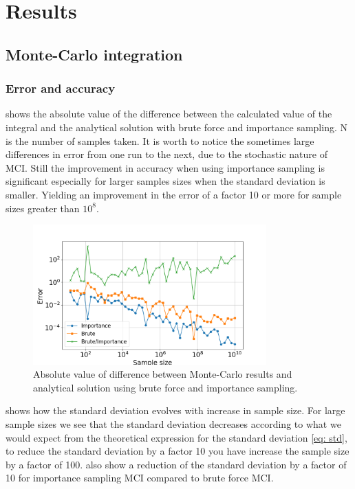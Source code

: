 \section{Results}

\subsection{Monte-Carlo integration}

\subsubsection{Error and accuracy}

 shows the absolute value of the difference between the
calculated value of the integral and the analytical solution with brute force
and importance sampling. N is the number of samples taken. It is worth to notice the sometimes
large differences in error from one run to the next, due to the stochastic nature of
MCI. Still the improvement in accuracy when using importance sampling
is significant especially for larger samples sizes when the standard
deviation is smaller. Yielding an improvement in the error of a factor 10 or
more for sample sizes greater than $10^8$.


\begin{figure}[H]
  \centering
  \includegraphics[width=0.8\textwidth]{../figures/mc_error.png}
  \caption{Absolute value of difference between Monte-Carlo results and analytical
  solution using brute force and importance sampling.}

  \label{fig:mc_error}
\end{figure}


 shows how the standard deviation evolves with increase in
sample size. For large sample sizes we see that the standard deviation decreases
according to what we would expect from the theoretical expression for the standard
deviation \cref{eq: std}, to reduce the standard deviation by a factor 10 you have increase the
sample size by a factor of 100. 
 also show a reduction of the standard deviation by a
factor of 10 for importance sampling MCI compared to brute force MCI.

